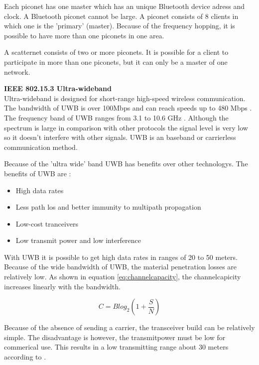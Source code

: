 \documentclass[10pt,a4paper]{article}
\begin{document}
Each piconet has one master which has an unique Bluetooth device adress and clock. A Bluetooth piconet cannot be large. A piconet consists of 8 clients in which one is the 'primary' (master).\cite{tcipbook} Because of the frequency hopping, it is possible to have more than one piconets in one area. 

A scatternet consists of two or more piconets. It is possible for a client to participate in more than one piconets, but it can only be a master of one network.

\textbf{\large IEEE 802.15.3 Ultra-wideband}\\
Ultra-wideband is designed for short-range high-speed wireless communication. The bandwidth of UWB is over 100Mbps and can reach speeds up to 480 Mbps \cite{comparitivestudywirelessprotocols}. The frequency band of UWB ranges from 3.1 to 10.6 GHz \cite{ultrawidebandwirelesscommunications}. Although the spectrum is large in comparison with other protocols the signal level is very low so it doesn't interfere with other signals. UWB is an baseband or carrierless communication method.

Because of the 'ultra wide' band UWB has benefits over other technologys. The benefits of UWB are \cite{ultrawidebandwirelesscommunications}\cite{combook}: 
\begin{itemize}
\setlength\itemsep{0em}
    \item High data rates
    \item Less path los and better immunity to multipath propagation
    \item Low-cost tranceivers
    \item Low transmit power and low interference
\end{itemize}
 With UWB it is possible to get high data rates in ranges of 20 to 50 meters. Because of the wide bandwidth of UWB, the material penetration losses are relatively low. As shown in equation \ref{eq:channelcapacity}, the channelcapicity increases linearly with the bandwidth.

 \begin{equation}
    C=Blog_2(1+\frac{S}{N})
    \label{eq:channelcapacity}
 \end{equation}

 Because of the absence of sending a carrier, the transceiver build can be relatively simple. \cite{ultrawidebandwirelesscommunications} The disadvantage is however, the transmitpower must be low for commerical use. This results in a low transmitting range about 30 meters according to \cite{combook}.
\end{document}
